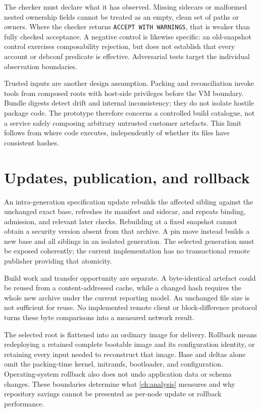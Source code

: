 The checker must declare what it has observed. Missing sidecars or malformed nested ownership fields cannot be treated as an empty, clean set of paths or owners. Where the checker returns \texttt{ACCEPT WITH WARNINGS}, that is weaker than fully checked acceptance. A negative control is likewise specific: an old-snapshot control exercises composability rejection, but does not establish that every account or debconf predicate is effective. Adversarial tests target the individual observation boundaries.

Trusted inputs are another design assumption. Packing and reconciliation invoke tools from composed roots with host-side privileges before the VM boundary. Bundle digests detect drift and internal inconsistency; they do not isolate hostile package code. The prototype therefore concerns a controlled build catalogue, not a service safely composing arbitrary untrusted customer artefacts. This limit follows from where code executes, independently of whether its files have consistent hashes.

\section{Updates, publication, and rollback}
\label{sec:arch:updates}

An intra-generation specification update rebuilds the affected sibling against the unchanged exact base, refreshes its manifest and sidecar, and repeats binding, admission, and relevant later checks. Rebuilding at a fixed snapshot cannot obtain a security version absent from that archive. A pin move instead builds a new base and all siblings in an isolated generation. The selected generation must be exposed coherently; the current implementation has no transactional remote publisher providing that atomicity.

Build work and transfer opportunity are separate. A byte-identical artefact could be reused from a content-addressed cache, while a changed hash requires the whole new archive under the current reporting model. An unchanged file size is not sufficient for reuse. No implemented remote client or block-difference protocol turns these byte comparisons into a measured network result.

The selected root is flattened into an ordinary image for delivery. Rollback means redeploying a retained complete bootable image and its configuration identity, or retaining every input needed to reconstruct that image. Base and deltas alone omit the packing-time kernel, initramfs, bootloader, and configuration. Operating-system rollback also does not undo application data or schema changes. These boundaries determine what \cref{ch:analysis} measures and why repository savings cannot be presented as per-node update or rollback performance.
